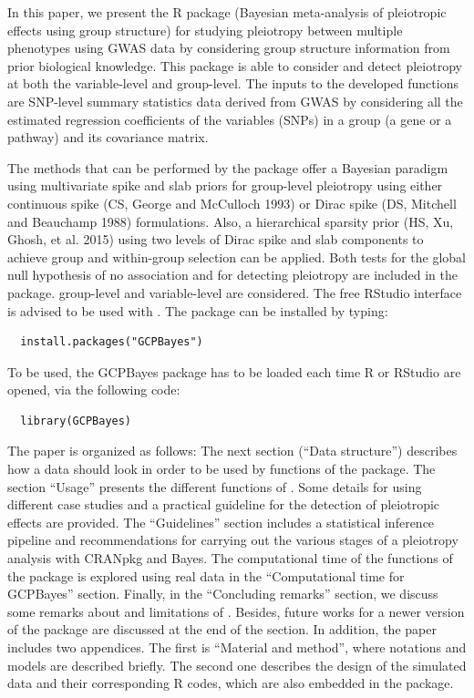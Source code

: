 In this paper, we present the  R package (Bayesian meta-analysis of pleiotropic effects using group structure) for studying pleiotropy between multiple phenotypes using GWAS data by considering group structure information from prior biological knowledge. This package is able to consider and detect pleiotropy at both the variable-level and group-level. The inputs to the developed functions are SNP-level summary statistics data
derived from GWAS by considering all the estimated regression coefficients of the variables (SNPs) in a group (a gene or a pathway) and its covariance matrix.

The methods that can be performed by the package offer a Bayesian paradigm using multivariate spike and slab priors for group-level pleiotropy using either continuous spike (CS, George and McCulloch 1993) or Dirac spike (DS, Mitchell and Beauchamp 1988) formulations. Also, a hierarchical sparsity prior (HS, Xu, Ghosh, et al. 2015) using two levels of Dirac spike and slab components to achieve group and within-group selection can be applied. Both tests for the global null hypothesis of no association and for detecting pleiotropy are included in the package.
group-level and variable-level are considered.
The free RStudio interface is advised to be used with
. The  package can be installed by typing:

\begin{verbatim}
  install.packages("GCPBayes")
\end{verbatim}

To be used, the GCPBayes package has to be loaded each time R or RStudio are opened, via the following code:

\begin{verbatim}
  library(GCPBayes)
\end{verbatim}

The paper is organized as follows:
The next section (``Data structure'') describes how a data should look in order to be used by functions of the  package.
The section ``Usage'' presents the different functions of . Some details for using different case studies and a practical guideline for the detection of pleiotropic effects are provided.
The ``Guidelines'' section includes a statistical inference pipeline and recommendations for carrying out the various stages of a pleiotropy analysis with CRANpkg and Bayes.
The computational time of the functions of the  package is explored using real data in the ``Computational time for GCPBayes'' section. Finally, in the ``Concluding remarks'' section, we discuss some
remarks about and limitations of . Besides, future works for a newer version of the package are discussed at the end of the section. In addition, the paper includes two appendices.
The first is
``Material and method'', where notations and models are described briefly.
The second one describes the design of the simulated data and their corresponding R codes, which are also embedded in the package.

